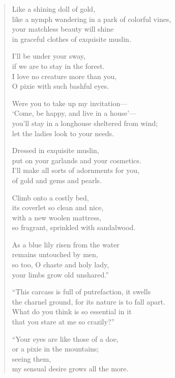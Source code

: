 \documentclass[12pt,openany]{book}%
\begin{document}
\begin{verse}
Like a shining doll of gold, \\
like a nymph wandering in a park of colorful vines, \\
your matchless beauty will shine \\
in graceful clothes of exquisite muslin. 

I’ll be under your sway, \\
if we are to stay in the forest. \\
I love no creature more than you, \\
O pixie with such bashful eyes. 

Were you to take up my invitation—\\
‘Come, be happy, and live in a house’—\\
you’ll stay in a longhouse sheltered from wind; \\
let the ladies look to your needs. 

Dressed in exquisite muslin, \\
put on your garlands and your cosmetics. \\
I’ll make all sorts of adornments for you, \\
of gold and gems and pearls. 

Climb onto a costly bed, \\
its coverlet so clean and nice, \\
with a new woolen mattress, \\
so fragrant, sprinkled with sandalwood. 

As a blue lily risen from the water \\
remains untouched by men, \\
so too, O chaste and holy lady, \\
your limbs grow old unshared.” 

“This carcass is full of putrefaction, it swells \\
the charnel ground, for its nature is to fall apart. \\
What do you think is so essential in it \\
that you stare at me so crazily?” 

“Your eyes are like those of a doe, \\
or a pixie in the mountains; \\
seeing them, \\
my sensual desire grows all the more. 


\end{verse}
\end{document}
